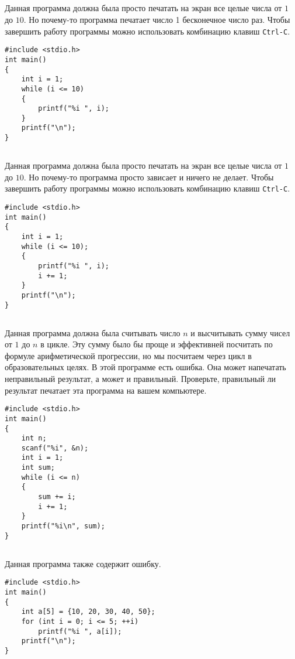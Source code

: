 \documentclass{article}
\begin{document}
\subsection{}
Данная программа должна была просто печатать на экран все целые числа от $1$ до $10$.
Но почему-то программа печатает число 1 бесконечное число раз.
Чтобы завершить работу программы можно использовать комбинацию клавиш  \texttt{Ctrl-C}.
\begin{lstlisting}
#include <stdio.h>
int main()
{
    int i = 1;
    while (i <= 10)
    {
        printf("%i ", i);
    }
    printf("\n");
}
\end{lstlisting}



\subsection{}
Данная программа должна была просто печатать на экран все целые числа от $1$ до $10$.
Но почему-то программа просто зависает и ничего не делает.
Чтобы завершить работу программы можно использовать комбинацию клавиш  \texttt{Ctrl-C}.
\begin{lstlisting}
#include <stdio.h>
int main()
{
    int i = 1;
    while (i <= 10);
    {
        printf("%i ", i);
        i += 1;
    }
    printf("\n");
}
\end{lstlisting}


\subsection{}
Данная программа должна была считывать число $n$ и высчитывать сумму чисел от $1$ до $n$ в цикле.
Эту сумму было бы проще и эффективней посчитать по формуле арифметической прогрессии, 
но мы посчитаем через цикл в образовательных целях.
В этой программе есть ошибка. Она может напечатать неправильный результат, а может и правильный.
Проверьте, правильный ли результат печатает эта программа на вашем компьютере.
\begin{lstlisting}
#include <stdio.h>
int main()
{
    int n;
    scanf("%i", &n);
    int i = 1;
    int sum;
    while (i <= n)
    {
        sum += i;
        i += 1;
    }
    printf("%i\n", sum);
}
\end{lstlisting}

\subsection{}
Данная программа также содержит ошибку.
\begin{lstlisting}
#include <stdio.h>
int main()
{
    int a[5] = {10, 20, 30, 40, 50};
    for (int i = 0; i <= 5; ++i)
    	printf("%i ", a[i]);
    printf("\n");
}
\end{lstlisting}
\end{document}
